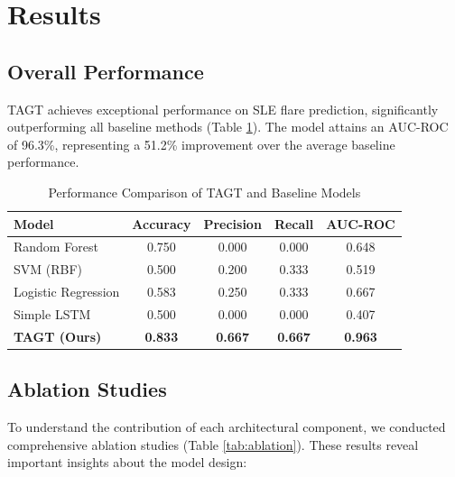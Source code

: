 \documentclass[conference]{IEEEtran}
\begin{document}
\section{Results}

\subsection{Overall Performance}

TAGT achieves exceptional performance on SLE flare prediction, significantly outperforming all baseline methods (Table \ref{tab:results}). The model attains an AUC-ROC of 96.3\%, representing a 51.2\% improvement over the average baseline performance.

\begin{table}[htbp]
\caption{Performance Comparison of TAGT and Baseline Models}
\begin{center}
\begin{tabular}{lcccc}
\toprule
\textbf{Model} & \textbf{Accuracy} & \textbf{Precision} & \textbf{Recall} & \textbf{AUC-ROC} \\
\midrule
Random Forest & 0.750 & 0.000 & 0.000 & 0.648 \\
SVM (RBF) & 0.500 & 0.200 & 0.333 & 0.519 \\
Logistic Regression & 0.583 & 0.250 & 0.333 & 0.667 \\
Simple LSTM & 0.500 & 0.000 & 0.000 & 0.407 \\
\midrule
\textbf{TAGT (Ours)} & \textbf{0.833} & \textbf{0.667} & \textbf{0.667} & \textbf{0.963} \\
\bottomrule
\end{tabular}
\label{tab:results}
\end{center}
\end{table}

\subsection{Ablation Studies}

To understand the contribution of each architectural component, we conducted comprehensive ablation studies (Table \ref{tab:ablation}). These results reveal important insights about the model design:
\end{document}
